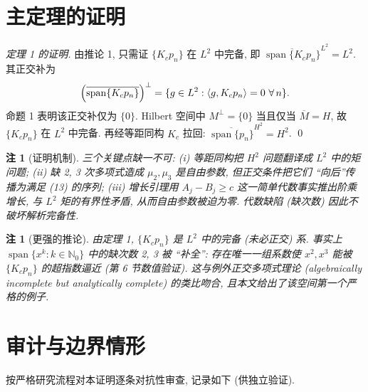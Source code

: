\documentclass[UTF8]{ctexart}
\newtheorem{remark}[theorem]{注}
\begin{document}
\section{主定理的证明}

\begin{proof}[定理 1 的证明]
由推论 1, 只需证 $\{ K_c p_n \}$ 在 $L^2$ 中完备, 即
$\overline{\operatorname{span}\{ K_c p_n \}}^{L^2} = L^2$. 其正交补为
\[
	\Bigl( \overline{\operatorname{span}\{ K_c p_n \}} \Bigr)^\perp
	= \{ g \in L^2 : \langle g, K_c p_n \rangle = 0\ \forall\, n \}.
\]
命题 1 表明该正交补仅为 $\{ 0 \}$. Hilbert 空间中 $M^\perp = \{0\}$
当且仅当 $\overline M = H$, 故 $\{ K_c p_n \}$ 在 $L^2$ 中完备. 再经等距同构
$K_c$ 拉回: $\overline{\operatorname{span}\{ p_n \}}^{H^2} = H^2$. \qed
\end{proof}

\begin{remark}[证明机制]
三个关键点缺一不可:
(i) 等距同构把 $H^2$ 问题翻译成 $L^2$ 中的矩问题;
(ii) 缺 2, 3 次多项式造成 $\mu_2, \mu_3$ 是自由参数, 但正交条件把它们
``向后''传播为满足 (13) 的序列;
(iii) 增长引理用 $A_j - B_j \geq c$ 这一简单代数事实推出阶乘增长,
与 $L^2$ 矩的有界性矛盾, 从而自由参数被迫为零. 代数缺陷
(缺次数) 因此不破坏解析完备性.
\end{remark}

\begin{remark}[更强的推论]
由定理 1, $\{K_c p_n\}$ 是 $L^2$ 中的完备 (未必正交) 系. 事实上
$\operatorname{span}\{ x^k : k \in \mathbb{N}_0 \}$ 中的缺次数 2, 3
被 ``补全'': 存在唯一一组系数使 $x^2, x^3$ 能被 $\{K_c p_n\}$
的超指数逼近 (第 6 节数值验证). 这与例外正交多项式理论
(algebraically incomplete but analytically complete) 的类比吻合,
且本文给出了该空间第一个严格的例子.
\end{remark}

\section{审计与边界情形}

按严格研究流程对本证明逐条对抗性审查, 记录如下 (供独立验证).
\end{document}
